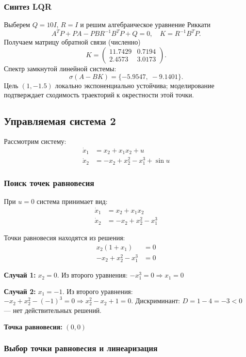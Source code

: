\subsubsection*{Синтез LQR}

Выберем $Q = 10I$, $R = I$ и решим алгебраическое уравнение Риккати
\[ A^T P + PA - PBR^{-1}B^T P + Q = 0,\quad K = R^{-1}B^T P. \]
Получаем матрицу обратной связи (численно)
\[
K = \begin{pmatrix}
11.7429 & 0.7194 \\
2.4573 & 3.0173
\end{pmatrix}.
\]
Спектр замкнутой линейной системы:
\[ \sigma(A-BK) = \{-5.9547,\;-9.1401\}. \]
Цель $(1,-1.5)$ локально экспоненциально устойчива; моделирование подтверждает сходимость траекторий к окрестности этой точки.

\subsection*{Управляемая система 2}

Рассмотрим систему:
\begin{align}
\dot{x}_1 &= x_2 + x_1 x_2 + u \\
\dot{x}_2 &= -x_2 + x_2^2 - x_1^3 + \sin u
\end{align}

\subsubsection*{Поиск точек равновесия}

При $u = 0$ система принимает вид:
\begin{align}
\dot{x}_1 &= x_2 + x_1 x_2 \\
\dot{x}_2 &= -x_2 + x_2^2 - x_1^3
\end{align}

Точки равновесия находятся из решения:
\begin{align}
x_2(1 + x_1) &= 0 \\
- x_2 + x_2^2 - x_1^3 &= 0
\end{align}

\textbf{Случай 1:} $x_2 = 0$. Из второго уравнения: $-x_1^3 = 0 \Rightarrow x_1 = 0$

\textbf{Случай 2:} $x_1 = -1$. Из второго уравнения: $-x_2 + x_2^2 - (-1)^3 = 0 \Rightarrow x_2^2 - x_2 + 1 = 0$.
Дискриминант: $D = 1 - 4 = -3 < 0$ --- нет действительных решений.

\textbf{Точка равновесия:} $(0, 0)$

\subsubsection*{Выбор точки равновесия и линеаризация}

